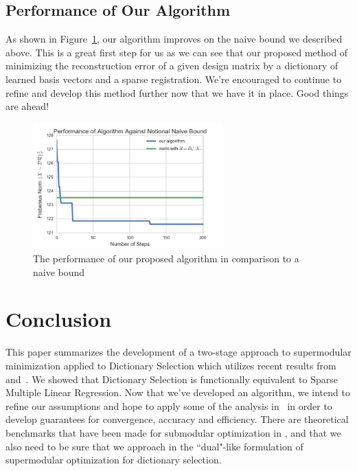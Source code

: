 \documentclass{article}
\begin{document}
\subsection{Performance of Our Algorithm}

As shown in Figure~\ref{fig:ouralg}, our algorithm improves on the naive bound we described above. This is a great first step for us as we can see that our proposed method of minimizing the reconstruction error of a given design matrix by a dictionary of learned basis vectors and a sparse registration. We're encouraged to continue to refine and develop this method further now that we have it in place. Good things are ahead!

\begin{figure}[ht!]
\centering
\includegraphics[width=0.65\textwidth]{src/our_alg.png}
\caption{The performance of our proposed algorithm in comparison to a naive bound}
\label{fig:ouralg}
\end{figure}



\section{Conclusion}\label{sec:conclude}
This paper summarizes the development of a two-stage approach to supermodular minimization applied to Dictionary Selection which utilizes recent results from~\cite{weaklyalpha} and~\cite{Singer16TwoStage}. We showed that Dictionary Selection is functionally equivalent to Sparse Multiple Linear Regression. Now that we've developed an algorithm, we intend to refine our assumptions and hope to apply some of the analysis in~\cite{Singer16TwoStage} in order to develop guarantees for convergence, accuracy and efficiency. There are theoretical benchmarks that have been made for submodular optimization in \cite{greedy_selection}, \cite{Krause05near-optimalnonmyopic} and \cite{nonconvexrelax} that we also need to be sure that we approach in the ``dual"-like formulation of supermodular optimization for dictionary selection.


\onehalfspacing


\end{document}

